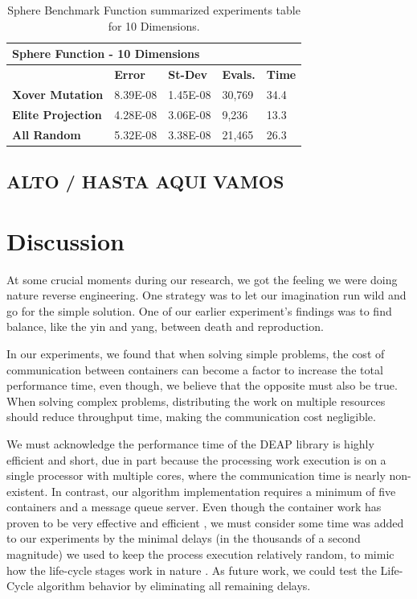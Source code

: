 \documentclass[graybox]{svmult}
\begin{document}
\begin{table}[]
    \scriptsize
    \centering
    \caption{Sphere Benchmark Function summarized experiments table for 10 Dimensions.}\label{tab.fun_sphere10}
    \begin{tabular}{@{}lllll@{}}
    \toprule
    \multicolumn{5}{l}{\textbf{Sphere Function - 10 Dimensions}} \\ \midrule
     & \textbf{Error} & \textbf{St-Dev} & \textbf{Evals.} & \textbf{Time} \\
    \textbf{Xover Mutation} & 8.39E-08 & 1.45E-08 & 30,769 & 34.4 \\
    \textbf{Elite Projection} & 4.28E-08 & 3.06E-08 & 9,236 & 13.3 \\
    \textbf{All Random} & 5.32E-08 & 3.38E-08 & 21,465 & 26.3 \\ \bottomrule
    \end{tabular}
    \end{table}

\subsection{ALTO / HASTA AQUI VAMOS}

\section{Discussion}
\label{section.discussion}

At some crucial moments during our research, we got the feeling we were doing
nature reverse engineering. One strategy was to let our imagination run wild
and go for the simple solution. One of our earlier experiment's findings was to
find balance, like the yin and yang, between death and reproduction.

In our experiments, we found that when solving simple problems, the cost of
communication between containers can become a factor to increase the total
performance time, even though, we believe that the opposite must also be true.
When solving complex problems, distributing the work on multiple resources
should reduce throughput time, making the communication cost negligible.

We must acknowledge the performance time of the DEAP library
\cite{fortin2012deap} is highly efficient and short, due in part because the
processing work execution is on a single processor with multiple cores, where
the communication time is nearly non-existent. In contrast, our algorithm
implementation requires a minimum of five containers and a message queue
server. Even though the container work has proven to be very effective and
efficient \cite{merelo2016performance,valdez2021container}, we must consider
some time was added to our experiments by the minimal delays (in the thousands
of a second magnitude) we used to keep the process execution relatively random,
to mimic how the life-cycle stages work in nature \cite{read1968system}. As
future work, we could test the Life-Cycle algorithm behavior by eliminating all
remaining delays.
\end{document}
